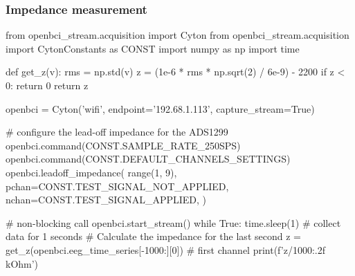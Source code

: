     







\subsubsection{Impedance measurement}


\begin{python}
from openbci_stream.acquisition import Cyton
from openbci_stream.acquisition import CytonConstants as CONST
import numpy as np
import time

def get_z(v):
    rms = np.std(v)
    z = (1e-6 * rms * np.sqrt(2) / 6e-9) - 2200
    if z < 0:
        return 0
    return z

openbci = Cyton('wifi', endpoint='192.68.1.113', capture_stream=True)

# configure the lead-off impedance for the ADS1299
openbci.command(CONST.SAMPLE_RATE_250SPS)
openbci.command(CONST.DEFAULT_CHANNELS_SETTINGS)
openbci.leadoff_impedance(
    range(1, 9),
    pchan=CONST.TEST_SIGNAL_NOT_APPLIED,
    nchan=CONST.TEST_SIGNAL_APPLIED,
)

# non-blocking call
openbci.start_stream()  
while True:
    time.sleep(1)  # collect data for 1 seconds
    #  Calculate the impedance for the last second
    z = get_z(openbci.eeg_time_series[-1000:][0])  # first channel
    print(f'{z/1000:.2f} kOhm')
\end{python}